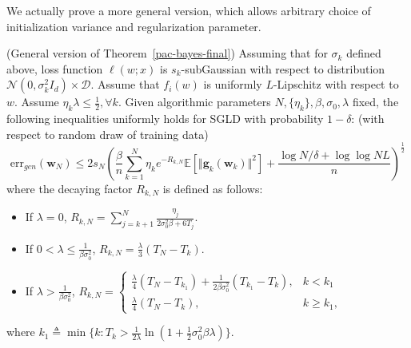 \documentclass[final,12pt]{colt2018} %
\begin{document}
We actually prove a more general version, which allows arbitrary choice of initialization variance and regularization parameter.
\begin{theorem}\label{pac-bayes-restated}(General version of Theorem~\ref{pac-bayes-final})
  Assuming that for $\sigma_k$ defined above, loss function $\ell(w;x)$ is $s_k$-subGaussian with respect to distribution $\mathcal{N}(0,\sigma_k^2I_d)\times \mathcal{D}$. Assume that $f_i(w)$ is uniformly $L$-Lipschitz with respect to $w$. Assume $\eta_k\lambda\leq \frac{1}{2},\forall k$. Given algorithmic parameters $N,\{\eta_k\},\beta,\sigma_0,\lambda$ fixed, the following inequalities uniformly holds for SGLD with probability $1-\delta$: (with respect to random draw of training data)
  \begin{equation}
      \mathrm{err}_{gen}(\bm{w}_N)\leq 2s_N\left(\frac{\beta}{n}\sum_{k=1}^{N} \eta_k e^{-R_{k,N}}\mathbb{E}\left[\Vert\bm{g}_k(\bm{w}_k)\Vert^2\right]+\frac{\log N/\delta+\log\log NL}{n}\right)^{\frac{1}{2}}
  \end{equation}
  where the decaying factor $R_{k,N}$ is defined as follows:
  \begin{itemize}
    \item If $\lambda=0$, $R_{k,N}=\sum_{j=k+1}^N\frac{\eta_j}{2\sigma_0^2\beta+6T_j}$.
    \item If $0<\lambda\leq \frac{1}{\beta\sigma_0^2}$, $R_{k,N}=\frac{\lambda}{3}(T_N-T_k)$.
    \item If $\lambda> \frac{1}{\beta\sigma_0^2}$,
    $R_{k,N}=
      \begin{cases}
        \frac{\lambda}{4}(T_N-T_{k_1})+\frac{1}{2 \beta \sigma_0^2}(T_{k_1}-T_k),&k<k_1\\
        \frac{\lambda}{4}(T_N-T_{k}),&k\geq k_1,
      \end{cases}$
  \end{itemize}
  where $k_1\triangleq \min\{k:T_k>\frac{1}{2 \lambda}\ln (1+\frac{1}{2}\sigma_0^2\beta \lambda)\}$.
\end{theorem}
\end{document}

